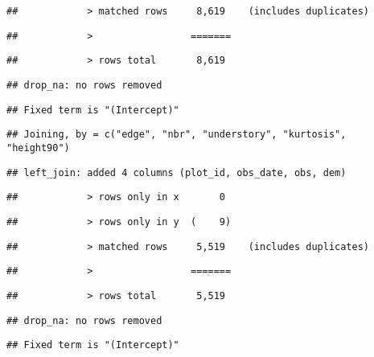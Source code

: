 \documentclass[
]{article}
\begin{document}
\begin{verbatim}
##            > matched rows     8,619    (includes duplicates)
\end{verbatim}

\begin{verbatim}
##            >                 =======
\end{verbatim}

\begin{verbatim}
##            > rows total       8,619
\end{verbatim}

\begin{verbatim}
## drop_na: no rows removed
\end{verbatim}

\begin{verbatim}
## Fixed term is "(Intercept)"
\end{verbatim}

\begin{verbatim}
## Joining, by = c("edge", "nbr", "understory", "kurtosis", "height90")
\end{verbatim}

\begin{verbatim}
## left_join: added 4 columns (plot_id, obs_date, obs, dem)
\end{verbatim}

\begin{verbatim}
##            > rows only in x       0
\end{verbatim}

\begin{verbatim}
##            > rows only in y  (    9)
\end{verbatim}

\begin{verbatim}
##            > matched rows     5,519    (includes duplicates)
\end{verbatim}

\begin{verbatim}
##            >                 =======
\end{verbatim}

\begin{verbatim}
##            > rows total       5,519
\end{verbatim}

\begin{verbatim}
## drop_na: no rows removed
\end{verbatim}

\begin{verbatim}
## Fixed term is "(Intercept)"
\end{verbatim}
\end{document}
